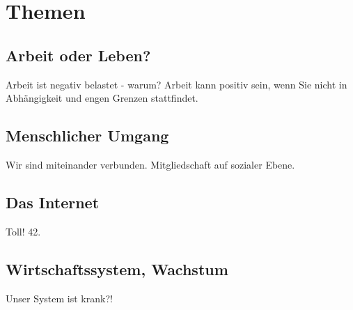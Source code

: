 \chapter{Themen}
  \section{Arbeit oder Leben?}
Arbeit ist negativ belastet - warum?
%
Arbeit kann positiv sein, wenn Sie nicht in Abhängigkeit und engen Grenzen stattfindet.
  \section{Menschlicher Umgang}
Wir sind miteinander verbunden.
%
Mitgliedschaft auf sozialer Ebene.
  \section{Das Internet}
Toll! 42.
  \section{Wirtschaftssystem, Wachstum}
Unser System ist krank?!